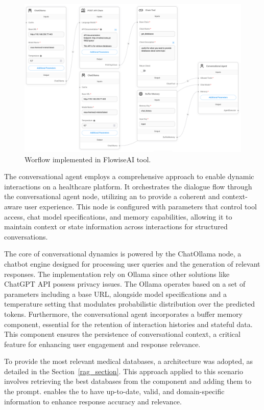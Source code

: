 \begin{figure}[ht]
    \includegraphics[width=\textwidth]{figs/chapter3/workflow.png}
    \centering
    \caption[Worflow implemented in FlowiseAI tool]{Worflow implemented in FlowiseAI tool.}
    \label{fig_workflow}
\end{figure}


The conversational agent employs a comprehensive approach to enable dynamic interactions on a healthcare {\ir} platform. It orchestrates the dialogue flow through the conversational agent node, utilizing an {\llm} to provide a coherent and context-aware user experience. This node is configured with parameters that control tool access, chat model specifications, and memory capabilities, allowing it to maintain context or state information across interactions for structured conversations.

The core of conversational dynamics is powered by the ChatOllama node, a chatbot engine designed for processing user queries and the generation of relevant responses. The implementation rely on Ollama since other solutions like ChatGPT API possess privacy issues. The Ollama operates based on a set of parameters including a base URL, alongside model specifications and a temperature setting that modulates probabilistic distribution over the predicted tokens. Furthermore, the conversational agent incorporates a buffer memory component, essential for the retention of interaction histories and stateful data. This component ensures the persistence of conversational context, a critical feature for enhancing user engagement and response relevance.

To provide the most relevant medical databases, a {\rag} architecture was adopted, as detailed in the Section~\ref{rag_section}. This approach applied to this scenario involves retrieving the best databases from the {\ir} component and adding them to the {\llm} prompt. {\rag} enables the {\llm} to have up-to-date, valid, and domain-specific information to enhance response accuracy and relevance. 


